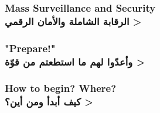\documentclass{beamer}
\begin{document}
	\begin{frame}
		\frametitle{Mass Surveillance and Security\\
		\<
		الرقابة الشاملة والأمان الرقمي
		>
		}
	\end{frame}
	
	\begin{frame}
		\frametitle{"Prepare!"\\
		\<
		وأعدّوا لهم ما استطعتم من قوّة
		>
		}
	\end{frame}
	
	\begin{frame}
		\frametitle{How to begin? Where?\\
		\<
		كيف أبدأ ومن أين؟
		>
		}
	\end{frame}
	
\end{document}
